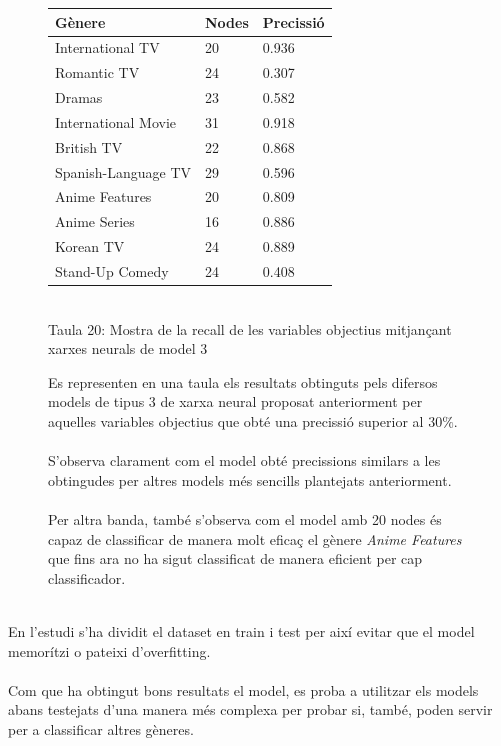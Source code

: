 \documentclass[a4paper, 11pt]{article}
\begin{document}
\begin{figure}[h] %
\begin{minipage}{7cm} %
\begin{center}
    \begin{tabular}{l|l|l}
        \textbf{Gènere} & \textbf{Nodes} & \textbf{Precissió}\\\hline\hline
        International TV & 20 & 0.936\\ \hline
        Romantic TV &  24 &  0.307 \\\hline
        Dramas &  23 &  0.582 \\\hline
        International Movie &  31 & 0.918 \\ \hline
        British TV & 22 & 0.868 \\ \hline
        Spanish-Language TV & 29 & 0.596 \\ \hline
        Anime Features & 20 & 0.809\\ \hline
        Anime Series & 16 & 0.886\\ \hline
        Korean TV & 24 & 0.889\\ \hline
        Stand-Up Comedy & 24 & 0.408 \\
    \end{tabular}
    \label{tab:afins}
    \\
    Taula 20: Mostra de la recall de les variables objectius mitjançant xarxes neurals de model 3 \setcounter{table}{20}
\end{center}
\end{minipage} %
\hspace{2em}
\begin{minipage}{7cm} %

Es representen en una taula els resultats obtinguts pels difersos models de tipus 3 de xarxa neural proposat anteriorment per aquelles variables objectius que obté una precissió superior al $30\%$.\\\\
S'observa clarament com el model obté precissions similars a les obtingudes per altres models més sencills plantejats anteriorment.\\\\
Per altra banda, també s'observa com el model amb 20 nodes és capaz de classificar de manera molt eficaç el gènere \textit{Anime Features} que fins ara no ha sigut classificat de manera eficient per cap classificador.
\end{minipage} %
\end{figure} %
\\
En l'estudi s'ha dividit el dataset en train i test per així evitar que el model memorítzi o pateixi d'overfitting.\\\\
Com que ha obtingut bons resultats el model, es proba a utilitzar els models abans testejats d'una manera més complexa per probar si, també, poden servir per a classificar altres gèneres.
\end{document}
